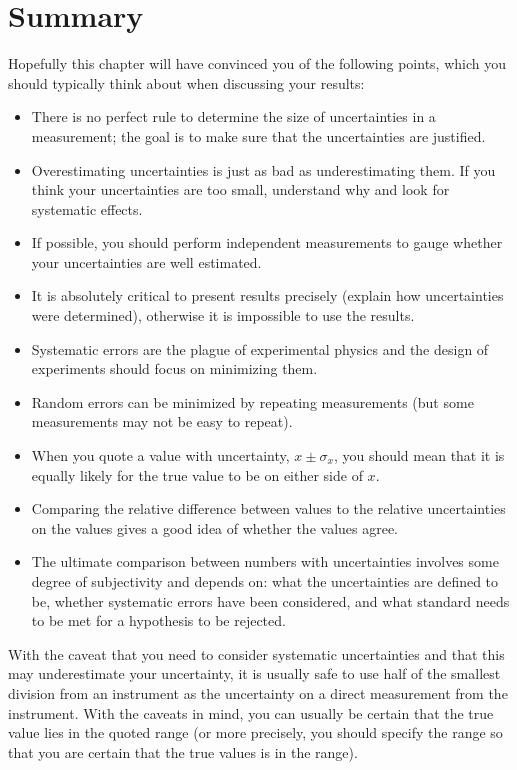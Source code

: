\section{Summary}
Hopefully this chapter will have convinced you of the following points, which you should typically think about when discussing your results:
\begin{itemize}
\item There is no perfect rule to determine the size of uncertainties in a measurement; the goal is to make sure that the uncertainties are justified.
\item Overestimating uncertainties is just as bad as underestimating them. If you think your uncertainties are too small, understand why and look for systematic effects.
\item If possible, you should perform independent measurements to gauge whether your uncertainties are well estimated.
\item It is absolutely critical to present results precisely (explain how uncertainties were determined), otherwise it is impossible to use the results.
\item Systematic errors are the plague of experimental physics and the design of experiments should focus on minimizing them.
\item Random errors can be minimized by repeating measurements (but some measurements may not be easy to repeat).
\item When you quote a value with uncertainty, $x\pm\sigma_x$, you should mean that it is equally likely for the true value to be on either side of $x$.
\item Comparing the relative difference between values to the relative uncertainties on the values gives a good idea of whether the values agree.
\item The ultimate comparison between numbers with uncertainties involves some degree of subjectivity and depends on: what the uncertainties are defined to be, whether systematic errors have been considered, and what standard needs to be met for a hypothesis to be rejected.
\end{itemize}

With the caveat that you need to consider systematic uncertainties and that this may underestimate your uncertainty, it is usually safe to use half of the smallest division from an instrument as the uncertainty on a direct measurement from the instrument. With the caveats in mind, you can usually be certain that the true value lies in the quoted range (or more precisely, you should specify the range so that you are certain that the true values is in the range).

